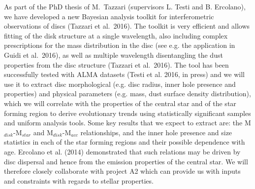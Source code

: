 As part of the PhD thesis of M.~Tazzari (supervisors L. Testi and B. Ercolano), we have developed a new Bayesian analysis toolkit for interferometric observations of discs (Tazzari et al.~2016). The toolkit is very efficient and allows fitting of the 
disk structure at a single wavelength, also including complex prescriptions for the mass distribution in the disc (see e.g. the application in Guidi et al.~2016), as well as multiple wavelength disentangling the dust properties from the disc structure (Tazzari et al.~2016). The tool has been successfully tested with ALMA datasets (Testi et al. 2016, in press) and we will use it to extract disc morphological (e.g. disc radius, inner hole presence and properties) and physical parameters (e.g. mass, dust surface density distribution), which we will correlate with the properties of the central star and of the star forming region to derive evolutionary trends using statistically significant samples and uniform analysis tools. Some key results that we expect to extract are: the M$_{disk}$-M$_{star}$ and M$_{disk}$-M$_{acc}$ relationships, and the inner hole presence and size statistics in each of the star forming regions and their possible dependence with age. Ercolano et al. (2014) demonstrated that such relations may be driven by disc dispersal and hence from the emission properties of the central star. We will therefore closely collaborate with project A2 which can provide us with inputs and constraints with regards to stellar properties. 


